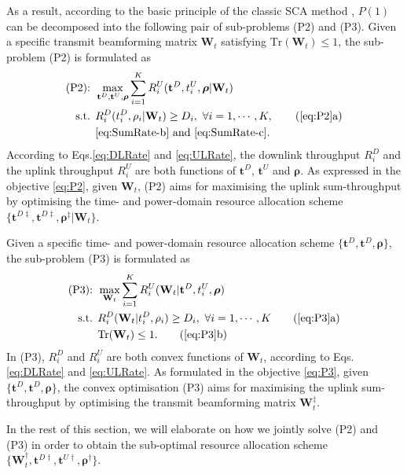 \documentclass[12pt,draftcls,onecolumn,journal]{IEEEtran}
\begin{document}
As a result, according to the basic principle of the classic SCA method \cite{sca}, $P(1)$ can be decomposed into the following pair of sub-problems (P2) and (P3). Given a specific transmit beamforming matrix $\mathbf{W}_t$ satisfying $\text{Tr}(\mathbf{W}_t) \leq 1$, the sub-problem (P2) is formulated as
\begin{align}
	\text{(P2): } & \max_{\mathbf{t}^D, \mathbf{t}^U, \boldsymbol{\rho}} \sum_{i=1}^K R_{i}^U (\mathbf{t}^D, t_i^U, \boldsymbol{\rho} | \mathbf{W}_t) \label{eq:P2}\\
	\text{s.t. } & R_{i}^D (t_i^D, \rho_i | \mathbf{W}_t) \geq D_i,\ \forall i = 1,\cdots, K, \tag{\ref{eq:P2}a} \label{eq:P2-a}\\
	& \text{\eqref{eq:SumRate-b} and \eqref{eq:SumRate-c}.} \nonumber
\end{align}
According to Eqs.\eqref{eq:DLRate} and \eqref{eq:ULRate}, the downlink throughput $R_{i}^D$ and the uplink throughput $R_i^U$ are both functions of $\mathbf{t}^D$, $\mathbf{t}^U$ and $\boldsymbol{\rho}$. As expressed in the objective \eqref{eq:P2}, given $\mathbf{W}_t$, (P2) aims for maximising the uplink sum-throughput by optimising the time- and power-domain resource allocation scheme $\{\mathbf{t}^{D\ddagger}, \mathbf{t}^{D\ddagger}, \boldsymbol{\rho}^{\ddagger} | \mathbf{W}_t\}$. 

Given a specific time- and power-domain resource allocation scheme $\{\mathbf{t}^{D}, \mathbf{t}^{D}, \boldsymbol{\rho}\}$, the sub-problem (P3) is formulated as
\begin{align}
	\text{(P3): } & \max_{\mathbf{W}_t} \sum_{i=1}^{K}  R_{i}^U (\mathbf{W}_t | \mathbf{t}^D, t_i^U, \boldsymbol{\rho}) \label{eq:P3} \\
	\text{s.t. } & R_{i}^D ( \mathbf{W}_t | t_i^D, \rho_i ) \geq D_i,\ \forall i = 1,\cdots, K \tag{\ref{eq:P3}a} \\
	             & \text{Tr}(\mathbf{W}_t) \leq 1. \tag{\ref{eq:P3}b}
\end{align}
In (P3), $R_i^D$ and $R_i^U$ are both convex functions of $\mathbf{W}_t$, according to Eqs.\eqref{eq:DLRate} and \eqref{eq:ULRate}. As formulated in the objective \eqref{eq:P3}, given $\{\mathbf{t}^{D}, \mathbf{t}^{D}, \boldsymbol{\rho}\}$, the convex optimisation (P3) aims for maximising the uplink sum-throughput by optimising the transmit beamforming matrix $\mathbf{W}_t^{\ddagger}$.

In the rest of this section, we will elaborate on how we jointly solve (P2) and (P3) in order to obtain the sub-optimal resource allocation scheme $\{\mathbf{W}_t^\dagger, \mathbf{t}^{D\dagger}, \mathbf{t}^{U\dagger}, \boldsymbol{\rho}^\dagger\}$.
\end{document}
